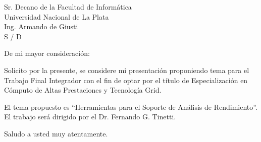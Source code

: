 \documentclass[a4paper]{letter}
\date{C\'ordoba, Agosto del 2010}
\begin{document}
\begin{letter}{Sr. Decano de la Facultad de Inform\'atica\\
Universidad Nacional de La Plata\\
Ing. Armando de Giusti\\
S / D}

\opening{De mi mayor consideraci\'on:}

Solicito por la presente, se considere mi presentaci\'on proponiendo tema para
el Trabajo Final Integrador con el fin de optar por el t\'itulo de
 Especializaci\'on en C\'omputo de Altas Prestaciones y Tecnolog\'ia Grid.

El tema propuesto es ``Herramientas para el Soporte de An\'alisis de
 Rendimiento''. El trabajo ser\'a dirigido por el Dr. Fernando G. Tinetti.

\closing{Saludo a usted muy atentamente.}

\end{letter}
\end{document}
